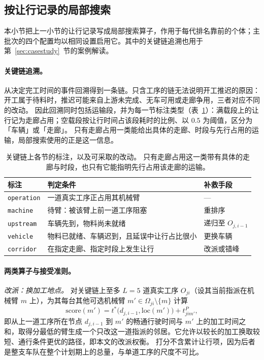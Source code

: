 \documentclass[manuscript,screen,review]{acmart}
\begin{document}
\subsection{按让行记录的局部搜索}
\label{sec:ls}
本小节把上一小节的让行记录写成局部搜索算子，作用于每代排名靠前的个体；主批次的四个配置均以相同设置启用它。其中的关键链追溯也用于第~\ref{sec:casestudy}~节的案例解读。

\paragraph{关键链追溯。}
从决定完工时间的事件回溯得到一条链。只含工序的链无法说明开工推迟的原因：开工属于待料时，推迟可能来自上游未完成、无车可用或走廊争用，三者对应不同的改动。
因此回溯同时包括运输段，并为每一节标注类型（表~\ref{tab:attrib}）：满载段上的让行记为走廊占用；空载段按让行时间占该段耗时的比例、以 $0.5$ 为阈值，区分为「车辆」或「走廊」。
只有走廊占用一类能给出具体的走廊、时段与先行占用的运输，局部搜索使用的正是这一信息。

\begin{table}[t]
  \caption{关键链上各节的标注，以及可采取的改动。
  只有走廊占用这一类带有具体的走廊与时段，也只有它能指明先行占用该走廊的运输。}
\label{tab:attrib}
\footnotesize
\begin{tabular}{@{}llp{2.55cm}@{}}
\toprule
标注 & 判定条件 & 补救手段 \\
\midrule
\texttt{operation} & 一道真实工序正占用其机械臂 & --- \\
\texttt{machine} & 待臂：被该臂上前一道工序阻塞
  & 重排序 \\
\texttt{upstream} & 车辆先到，物料尚未就绪 & 递归至 $O_{j,i-1}$ \\
\texttt{vehicle} & 物料已就绪、车辆迟到，且延误中让行占比很小 & 更换车辆 \\
\texttt{corridor} & 在指定走廊、指定时段上发生让行 & 改派或错峰 \\
\bottomrule
\end{tabular}
\end{table}

\paragraph{两类算子与接受准则。}
\emph{改派：换加工地点。} 对关键链上至多 $L=5$ 道真实工序 $O_{ji}$（设其当前指派在机械臂 $m$ 上），为其每台其他可选机械臂
$m'\in\Omega_{ji}\setminus\{m\}$ 计算
\begin{equation}
\label{eq:reassign}
\mathrm{score}(m')=t^{*}\bigl(d_{j,i-1},\mathrm{loc}(m')\bigr)
+t^{P}_{jim'},
\end{equation}
即从上一道工序所在节点 $d_{j,i-1}$ 到 $m'$ 的畅通行驶时间与 $m'$ 上的加工时间之和，取得分最低的臂生成一个只改这一道指派的邻居。它允许以较长的加工换取较短、通行条件更优的路径，即本文的改派权衡。
打分不含累计让行项，因为后者是整支车队在整个计划期上的总量，与单道工序的尺度不可比。
\end{document}
